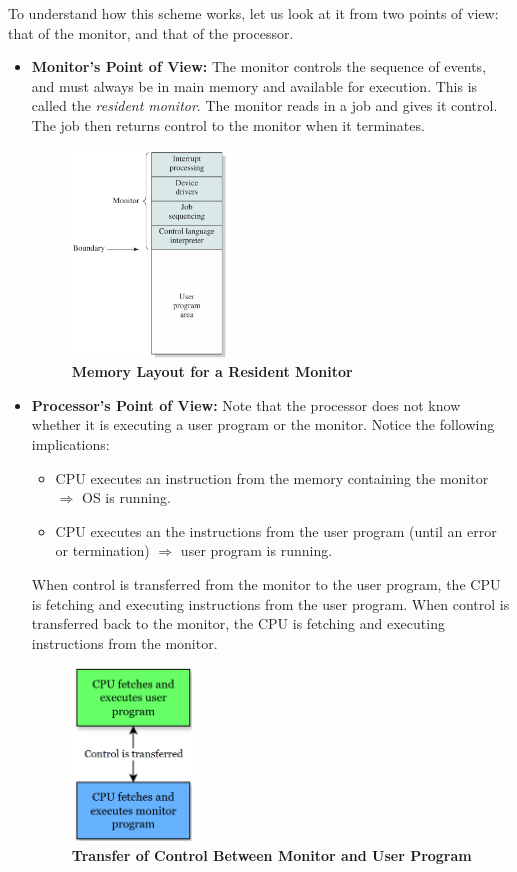 \documentclass{article}
\begin{document}
\newpage
To understand how this scheme works, let us look at it from two points of view: 
that of the monitor, and that of the processor.
\begin{itemize}
    \item \textbf{Monitor's Point of View:} The monitor controls the sequence of events, and must always be in main memory and available for execution.
    This is called the \textit{resident monitor}. The monitor reads in a job and gives it control. The job then returns control to the monitor when it terminates.
    \begin{figure}[!h]
        \centering
        \includegraphics[width=0.4\textwidth]{figures/Ch02Figure3.png} %
        \caption{\textbf{Memory Layout for a Resident Monitor}}
        \label{fig:Ch02Fig3}
    \end{figure}
    \item \textbf{Processor's Point of View:} Note that the processor does not know whether it is executing a user program or the monitor.
    Notice the following implications:
    \begin{itemize}
        \item CPU executes an instruction from the memory containing the monitor $\Rightarrow$ OS is running.
        \item CPU executes an the instructions from the user program (until an error or termination) $\Rightarrow$ user program is running.
    \end{itemize}
    When control is transferred from the monitor to the user program, the CPU is fetching and executing instructions from the user program.
    When control is transferred back to the monitor, the CPU is fetching and executing instructions from the monitor.
    \begin{figure}[!h]
        \centering
        \includegraphics[width=0.3\textwidth]{figures/Ch02Figure4.png} %
        \caption{\textbf{Transfer of Control Between Monitor and User Program}}
        \label{fig:Ch02Fig4}
    \end{figure}
\end{itemize}
\end{document}
